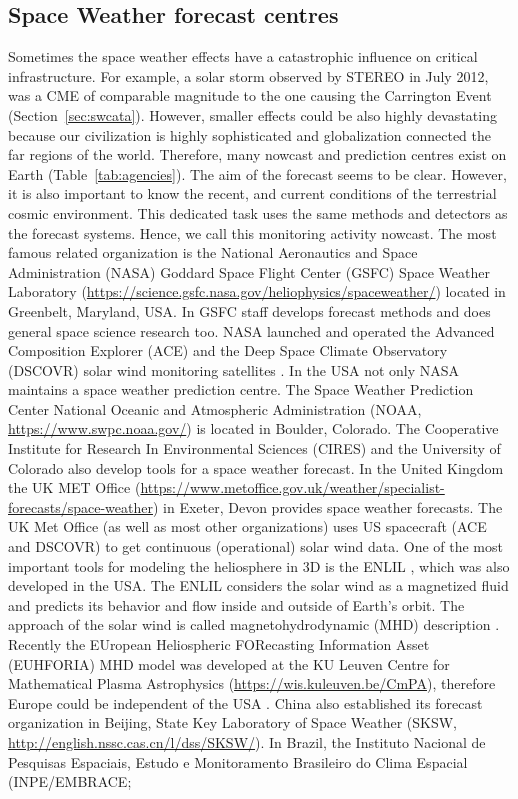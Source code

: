 \documentclass[sn-aps]{sn-jnl}%
\begin{document}
\subsection{Space Weather forecast centres}
\label{sec:swpred}

Sometimes the space weather effects have a catastrophic influence on critical infrastructure. For example, a solar storm observed by STEREO in July 2012, was a CME of comparable magnitude to the one causing the Carrington Event (Section~\ref{sec:swcata}). However, smaller effects could be also highly devastating because our civilization is highly sophisticated and globalization connected the far regions of the world. Therefore, many nowcast and prediction centres exist on Earth (Table~\ref{tab:agencies}). The aim of the forecast seems to be clear. However, it is also important to know the recent, and current conditions of the terrestrial cosmic environment. This dedicated task uses the same methods and detectors as the forecast systems. Hence, we call this monitoring activity nowcast. The most famous related organization is the National Aeronautics and Space Administration (NASA) Goddard Space Flight Center (GSFC) Space Weather Laboratory (\url{https://science.gsfc.nasa.gov/heliophysics/spaceweather/}) located in Greenbelt, Maryland, USA. In GSFC staff develops forecast methods and does general space science research too. NASA launched and operated the Advanced Composition Explorer (ACE) and the Deep Space Climate Observatory (DSCOVR) solar wind monitoring satellites \cite{stone98:_advan_compos_explor,lotoaniu22:_valid_dscov_spacec_mission_space}. In the USA not only NASA maintains a space weather prediction centre. The Space Weather Prediction Center National Oceanic and Atmospheric Administration (NOAA, \url{https://www.swpc.noaa.gov/}) is located in Boulder, Colorado. The Cooperative Institute for Research In Environmental Sciences (CIRES) and the University of Colorado also develop tools for a space weather forecast. In the United Kingdom the UK MET Office (\url{https://www.metoffice.gov.uk/weather/specialist-forecasts/space-weather}) in Exeter, Devon provides space weather forecasts. The UK Met Office (as well as most other organizations) uses US spacecraft (ACE and DSCOVR) to get continuous (operational) solar wind data. One of the most important tools for modeling the heliosphere in 3D is the ENLIL \cite{odstrcil03:_model_d}, which was also developed in the USA. The ENLIL considers the solar wind as a magnetized fluid and predicts its behavior and flow inside and outside of Earth's orbit. The approach of the solar wind is called magnetohydrodynamic (MHD) description \cite{baumjohann96:_basic}.  Recently the EUropean Heliospheric FORecasting Information Asset (EUHFORIA) MHD model was developed at the KU Leuven Centre for Mathematical Plasma Astrophysics (\url{https://wis.kuleuven.be/CmPA}), therefore Europe could be independent of the USA \cite{pomoell18:_euhfor}. China also established its forecast organization in Beijing, State Key Laboratory of Space Weather  (SKSW, \url{http://english.nssc.cas.cn/l/dss/SKSW/}). In Brazil, the Instituto Nacional de Pesquisas Espaciais, Estudo e Monitoramento Brasileiro do Clima Espacial (INPE/EMBRACE; 
\end{document}
